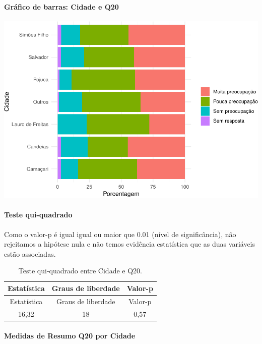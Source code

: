 \documentclass[]{article}
\let\oldparagraph\paragraph
\renewcommand{\paragraph}[1]{\oldparagraph{#1}\mbox{}}
\begin{document}
\hypertarget{gruxe1fico-de-barras-cidade-e-q20}{%
\paragraph{Gráfico de barras: Cidade e Q20}\label{gruxe1fico-de-barras-cidade-e-q20}}

\begin{center}\includegraphics[width=0.75\linewidth]{relatorio_covid19_files/figure-latex/unnamed-chunk-368-1} \end{center}

\hypertarget{teste-qui-quadrado-32}{%
\paragraph{Teste qui-quadrado}\label{teste-qui-quadrado-32}}

Como o valor-p é igual igual ou maior que 0.01 (nível de significância), não rejeitamos a hipótese nula e não temos evidência estatística que as duas variáveis estão associadas.

\begin{longtable}[]{@{}ccc@{}}
\caption{\label{tab:unnamed-chunk-370}Teste qui-quadrado entre Cidade e Q20.}\tabularnewline
\toprule
Estatística & Graus de liberdade & Valor-p\tabularnewline
\midrule
\endfirsthead
\toprule
Estatística & Graus de liberdade & Valor-p\tabularnewline
\midrule
\endhead
16,32 & 18 & 0,57\tabularnewline
\bottomrule
\end{longtable}

\cleardoublepage

\hypertarget{medidas-de-resumo-q20-por-cidade}{%
\paragraph{Medidas de Resumo Q20 por Cidade}\label{medidas-de-resumo-q20-por-cidade}}
\end{document}
